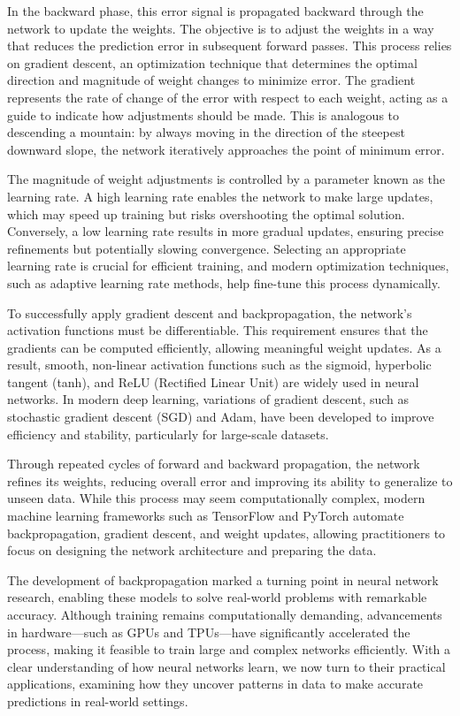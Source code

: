 \documentclass[
  11pt,
]{book}
\theoremstyle{definition}
\theoremstyle{definition}
\theoremstyle{definition}
\theoremstyle{definition}
\theoremstyle{remark}
\begin{document}
In the backward phase, this error signal is propagated backward through the network to update the weights. The objective is to adjust the weights in a way that reduces the prediction error in subsequent forward passes. This process relies on gradient descent, an optimization technique that determines the optimal direction and magnitude of weight changes to minimize error. The gradient represents the rate of change of the error with respect to each weight, acting as a guide to indicate how adjustments should be made. This is analogous to descending a mountain: by always moving in the direction of the steepest downward slope, the network iteratively approaches the point of minimum error.

The magnitude of weight adjustments is controlled by a parameter known as the learning rate. A high learning rate enables the network to make large updates, which may speed up training but risks overshooting the optimal solution. Conversely, a low learning rate results in more gradual updates, ensuring precise refinements but potentially slowing convergence. Selecting an appropriate learning rate is crucial for efficient training, and modern optimization techniques, such as adaptive learning rate methods, help fine-tune this process dynamically.

To successfully apply gradient descent and backpropagation, the network's activation functions must be differentiable. This requirement ensures that the gradients can be computed efficiently, allowing meaningful weight updates. As a result, smooth, non-linear activation functions such as the sigmoid, hyperbolic tangent (tanh), and ReLU (Rectified Linear Unit) are widely used in neural networks. In modern deep learning, variations of gradient descent, such as stochastic gradient descent (SGD) and Adam, have been developed to improve efficiency and stability, particularly for large-scale datasets.

Through repeated cycles of forward and backward propagation, the network refines its weights, reducing overall error and improving its ability to generalize to unseen data. While this process may seem computationally complex, modern machine learning frameworks such as TensorFlow and PyTorch automate backpropagation, gradient descent, and weight updates, allowing practitioners to focus on designing the network architecture and preparing the data.

The development of backpropagation marked a turning point in neural network research, enabling these models to solve real-world problems with remarkable accuracy. Although training remains computationally demanding, advancements in hardware---such as GPUs and TPUs---have significantly accelerated the process, making it feasible to train large and complex networks efficiently. With a clear understanding of how neural networks learn, we now turn to their practical applications, examining how they uncover patterns in data to make accurate predictions in real-world settings.
\end{document}

